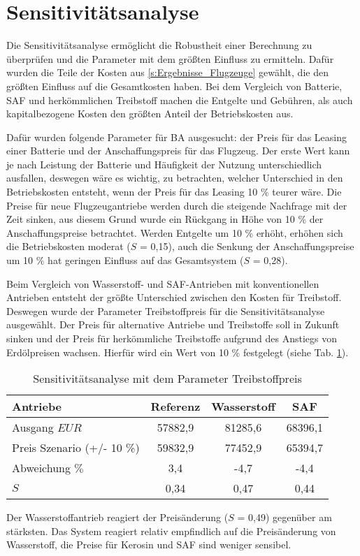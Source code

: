 \FloatBarrier
\section{Sensitivitätsanalyse}
\label{s:Sensitivitätsanalyse}
%
Die Sensitivitätsanalyse ermöglicht die Robustheit einer Berechnung zu überprüfen 
und die Parameter mit dem größten Einfluss zu ermitteln. 
Dafür wurden die Teile der Kosten aus \ref{s:Ergebnisse_Flugzeuge} gewählt, 
die den größten Einfluss auf die Gesamtkosten haben. 
Bei dem Vergleich von Batterie, SAF und herkömmlichen Treibstoff 
machen die Entgelte und Gebühren, als auch kapitalbezogene Kosten den größten Anteil der Betriebskosten aus. %

Dafür wurden folgende Parameter für BA ausgesucht: der Preis für das Leasing einer Batterie 
und der Anschaffungspreis für das Flugzeug.
Der erste Wert kann je nach Leistung der Batterie und Häufigkeit der Nutzung unterschiedlich ausfallen, 
deswegen wäre es wichtig, zu betrachten, welcher Unterschied in den Betriebskosten entsteht, 
wenn der Preis für das Leasing 10 \% teurer wäre. 
Die Preise für neue Flugzeugantriebe werden durch die steigende Nachfrage mit der Zeit sinken, 
aus diesem Grund wurde ein Rückgang in Höhe von 10 \% der Anschaffungspreise betrachtet.
%
Werden Entgelte um 10 \% erhöht, erhöhen sich die Betriebskosten moderat ($S$ = 0,15), 
auch die Senkung der Anschaffungspreise um 10 \% hat geringen Einfluss auf das Gesamtsystem ($S$ = 0,28).

Beim Vergleich von Wasserstoff- und SAF-Antrieben mit konventionellen Antrieben 
entsteht der größte Unterschied zwischen den Kosten für Treibstoff. 
Deswegen wurde der Parameter \glqq Treibstoffpreis\grqq{} für die Sensitivitätsanalyse ausgewählt.
Der Preis für alternative Antriebe und Treibstoffe soll in Zukunft sinken und der Preis 
für herkömmliche Treibstoffe aufgrund des Anstiegs von Erdölpreisen wachsen. 
Hierfür wird ein Wert von 10 \% festgelegt (siehe Tab. \ref{sensiv}).
%
\begin{table}[h]
	\begin{center}
    \caption{Sensitivitätsanalyse mit dem Parameter Treibstoffpreis}
	\label{sensiv}
	\begin{tabular}{|l|c|c|c|}
		\hline
		\textbf{Antriebe} & \textbf{Referenz}& \textbf{Wasserstoff}& \textbf{SAF} \\ \hline
		Ausgang $EUR$ & 57882,9 & 81285,6 & 68396,1	\\ \hline
        Preis Szenario (+/- 10 \%) & 59832,9 & 77452,9 & 65394,7\\ \hline
        Abweichung $\%$ & 3,4 & -4,7 & -4,4 \\ \hline
		$S$ & 0,34 & 0,47 & 0,44 \\ \hline
	\end{tabular}
    \end{center}
\end{table}
%
Der Wasserstoffantrieb reagiert der Preisänderung ($S$ = 0,49) gegenüber am stärksten. 
Das System reagiert relativ empfindlich auf die Preisänderung von Wasserstoff, 
die Preise für Kerosin und SAF sind weniger sensibel.
